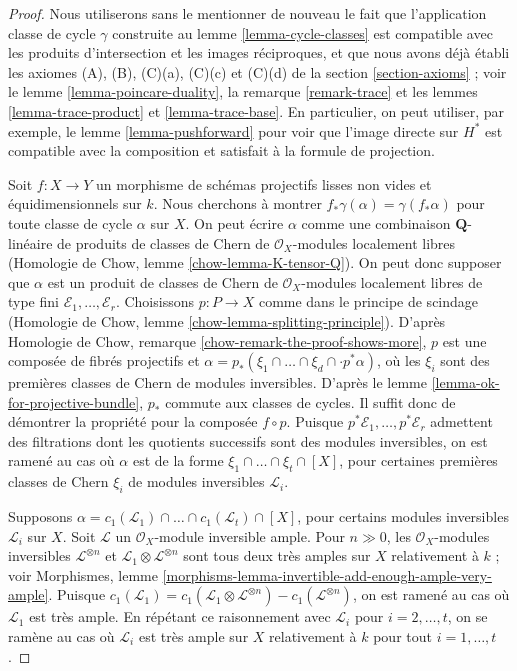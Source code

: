 \begin{proof}
Nous utiliserons sans le mentionner de nouveau le fait que l'application
classe de cycle $\gamma$ construite au lemme \ref{lemma-cycle-classes}
est compatible avec les produits d'intersection et les images réciproques,
et que nous avons déjà établi les axiomes
(A), (B), (C)(a), (C)(c) et (C)(d) de la section \ref{section-axioms} ; voir
le lemme \ref{lemma-poincare-duality},
la remarque \ref{remark-trace} et
les lemmes \ref{lemma-trace-product} et \ref{lemma-trace-base}.
En particulier, on peut utiliser, par exemple, le lemme \ref{lemma-pushforward}
pour voir que l'image directe sur $H^*$ est compatible avec la composition
et satisfait à la formule de projection.

\medskip\noindent
Soit $f : X \to Y$ un morphisme de schémas projectifs lisses
non vides et équidimensionnels sur $k$.
Nous cherchons à montrer $f_*\gamma(\alpha) = \gamma(f_*\alpha)$
pour toute classe de cycle $\alpha$ sur $X$.
On peut écrire $\alpha$ comme une combinaison $\mathbf{Q}$-linéaire de produits de
classes de Chern de $\mathcal{O}_X$-modules localement libres
(Homologie de Chow, lemme \ref{chow-lemma-K-tensor-Q}).
On peut donc supposer que $\alpha$ est un produit de classes de Chern de
$\mathcal{O}_X$-modules localement libres de type fini
$\mathcal{E}_1, \ldots, \mathcal{E}_r$.
Choisissons $p : P \to X$ comme dans le principe de scindage
(Homologie de Chow, lemme \ref{chow-lemma-splitting-principle}).
D'après Homologie de Chow, remarque \ref{chow-remark-the-proof-shows-more},
$p$ est une composée de fibrés projectifs et
$\alpha = p_*(\xi_1 \cap \ldots \cap \xi_d \cap \cdot p^*\alpha)$,
où les $\xi_i$ sont des premières classes de Chern de modules inversibles.
D'après le lemme \ref{lemma-ok-for-projective-bundle},
$p_*$ commute aux classes de cycles.
Il suffit donc de démontrer la propriété pour la composée
$f \circ p$. Puisque $p^*\mathcal{E}_1, \ldots, p^*\mathcal{E}_r$
admettent des filtrations dont les quotients successifs sont des modules
inversibles, on est ramené au cas où $\alpha$ est
de la forme $\xi_1 \cap \ldots \cap \xi_t \cap [X]$,
pour certaines premières classes de Chern $\xi_i$ de modules inversibles $\mathcal{L}_i$.

\medskip\noindent
Supposons
$\alpha = c_1(\mathcal{L}_1) \cap \ldots \cap c_1(\mathcal{L}_t) \cap [X]$,
pour certains modules inversibles $\mathcal{L}_i$ sur $X$.
Soit $\mathcal{L}$ un $\mathcal{O}_X$-module inversible ample.
Pour $n \gg 0$, les $\mathcal{O}_X$-modules inversibles
$\mathcal{L}^{\otimes n}$ et
$\mathcal{L}_1 \otimes \mathcal{L}^{\otimes n}$ sont tous deux
très amples sur $X$ relativement à $k$ ; voir
Morphismes, lemme \ref{morphisms-lemma-invertible-add-enough-ample-very-ample}.
Puisque $c_1(\mathcal{L}_1) = c_1(\mathcal{L}_1 \otimes \mathcal{L}^{\otimes n})
- c_1(\mathcal{L}^{\otimes n})$, on est ramené au cas où
$\mathcal{L}_1$ est très ample. En répétant ce raisonnement avec $\mathcal{L}_i$
pour $i = 2, \ldots, t$, on se ramène au cas où $\mathcal{L}_i$
est très ample sur $X$ relativement à $k$ pour tout $i = 1, \ldots, t$.


\end{proof}
